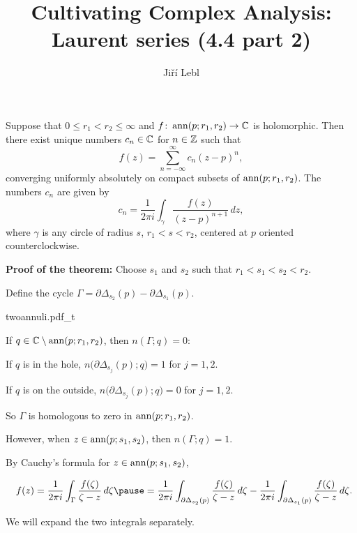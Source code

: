 \documentclass[10pt,aspectratio=169]{beamer}
\author{Ji\v{r}\'i Lebl}
\institute[OSU]{%
Departemento pri Matematiko de Oklahoma {\^S}tata Universitato}
\title{Cultivating Complex Analysis:\\%
Laurent series (4.4 part 2)}
\date{}
\begin{document}
\begin{frame}
\titlepage
\end{frame}

\begin{frame}
\begin{theorem}
Suppose that $0 \leq r_1 < r_2 \leq \infty$ and
$f \colon \operatorname{ann}(p;r_1,r_2) \to {\mathbb{C}}$ is holomorphic.
\pause
Then there exist unique numbers $c_n \in {\mathbb{C}}$ for $n \in {\mathbb{Z}}$ such that
\[
f(z) = \sum_{n=-\infty}^{\infty} c_n {(z-p)}^n ,
\]
converging uniformly absolutely on compact subsets of
$\operatorname{ann}(p;r_1,r_2)$.
\pause
The numbers $c_n$ are given by
\[
c_n = 
\frac{1}{2\pi i}
\int_{\gamma}
\frac{f(z)}{{(z-p)}^{n+1}}
\,
dz  ,
\]
where $\gamma$ is any circle of radius $s$, $r_1 < s < r_2$, centered at
$p$ oriented counterclockwise.
\end{theorem}
\end{frame}

\begin{frame}

\textbf{Proof of the theorem:}
Choose $s_1$ and $s_2$ such that $r_1 < s_1 < s_2 < r_2$.

\medskip
\pause

Define the cycle
\qquad $\Gamma = \partial \Delta_{s_2}(p) - \partial \Delta_{s_1}(p)$.

\vspace*{-0.2in}
\hspace*{3.7in}%
{twoannuli.pdf_t}

\vspace*{-1.45in}

\pause
If $q \in {\mathbb{C}} \setminus \operatorname{ann}(p;r_1,r_2)$, then $n(\Gamma;q) = 0$:

\medskip
\pause

If $q$ is in the hole,
$n\bigl(\partial \Delta_{s_j}(p);q\bigr) = 1$ for $j=1,2$.


\medskip
\pause

If $q$ is on the outside,
$n\bigl(\partial \Delta_{s_j}(p);q\bigr) = 0$ for $j=1,2$.

\medskip
\pause

So $\Gamma$ is homologous to zero in $\operatorname{ann}(p;r_1,r_2)$.


\medskip
\pause

However, when $z \in \operatorname{ann}(p;s_1,s_2)$, then $n(\Gamma;q) = 1$.

\medskip
\pause

By Cauchy's formula for $z \in \operatorname{ann}(p;s_1,s_2)$,

\medskip
$\displaystyle
\quad
f(z) = 
\frac{1}{2\pi i}
\int_{\Gamma} \frac{f(\zeta)}{\zeta-z} \, d\zeta 
\pause
=
\frac{1}{2\pi i}
\int_{\partial \Delta_{s_2}(p)} \frac{f(\zeta)}{\zeta-z} \, d\zeta 
-
\frac{1}{2\pi i}
\int_{\partial \Delta_{s_1}(p)} \frac{f(\zeta)}{\zeta-z} \, d\zeta  .
$
\medskip
\pause

We will expand the two integrals separately.
\end{frame}
\end{document}
